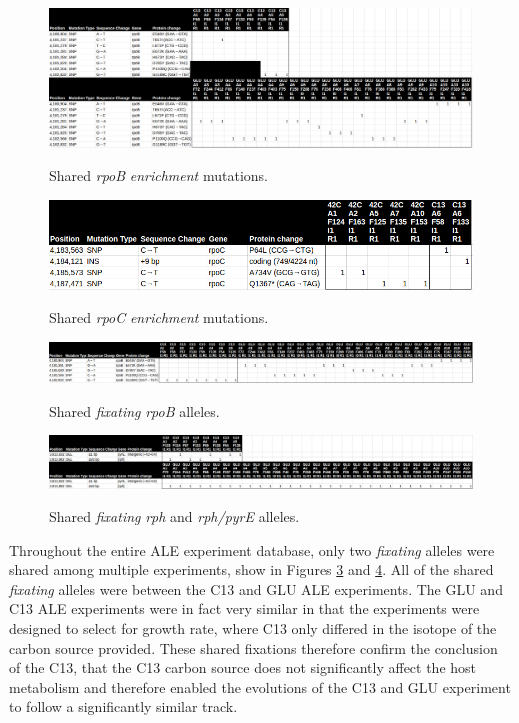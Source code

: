 \documentclass[12pt,final,masters,chapterheads]{ucsd}  %
\begin{document}
\begin{figure}[h!]
  \caption{Shared \textit{rpoB} \textit{enrichment} mutations.}
  \centering
  \includegraphics[width=\textwidth]{rpoB_shared_enrich_mut.png}
  \label{fig:rpoB_shared_enrich_mut}
\end{figure}

\begin{figure}[h!]
  \caption{Shared \textit{rpoC} \textit{enrichment} mutations.}
  \centering
  \includegraphics[width=\textwidth]{rpoC_shared_enrich_mut.png}
  \label{fig:rpoC_shared_enrich_mut}
\end{figure}

\begin{figure}[h!]
  \caption{Shared \textit{fixating} \textit{rpoB} alleles.}
  \centering
  \includegraphics[width=\textwidth]{shared_fixating_rpoB.png}
  \label{fig:shared_fixating_rpoB}
\end{figure}

\begin{figure}[h!]
  \caption{Shared \textit{fixating} \textit{rph} and \textit{rph/pyrE} alleles.}
  \centering
  \includegraphics[width=\textwidth]{shared_fixating_rph-pyrE.png}
  \label{fig:shared_fixating_rph-pyrE}
\end{figure}

Throughout the entire ALE experiment database, only two \textit{fixating} alleles were shared among multiple experiments, show in Figures \ref{fig:shared_fixating_rpoB} and \ref{fig:shared_fixating_rph-pyrE}. All of the shared \textit{fixating} alleles were between the C13 and GLU ALE experiments. The GLU and C13 ALE experiments were in fact very similar in that the experiments were designed to select for growth rate, where C13 only differed in the isotope of the carbon source provided. These shared fixations therefore confirm the conclusion of the C13, that the C13 carbon source does not significantly affect the host metabolism and therefore enabled the evolutions of the C13 and GLU experiment to follow a significantly similar track.
\end{document}
